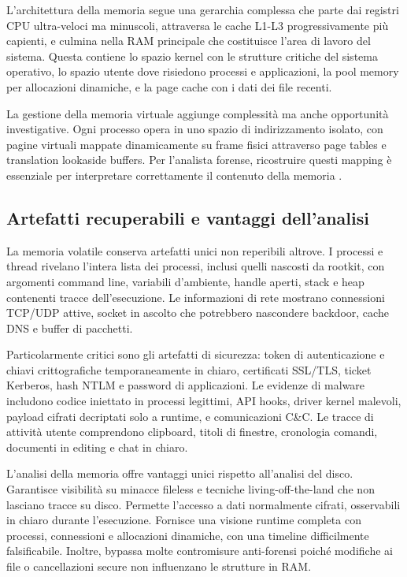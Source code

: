 L'architettura della memoria segue una gerarchia complessa che parte dai registri CPU ultra-veloci ma minuscoli, attraversa le cache L1-L3 progressivamente più capienti, e culmina nella RAM principale che costituisce l'area di lavoro del sistema. Questa contiene lo spazio kernel con le strutture critiche del sistema operativo, lo spazio utente dove risiedono processi e applicazioni, la pool memory per allocazioni dinamiche, e la page cache con i dati dei file recenti.

La gestione della memoria virtuale aggiunge complessità ma anche opportunità investigative. Ogni processo opera in uno spazio di indirizzamento isolato, con pagine virtuali mappate dinamicamente su frame fisici attraverso page tables e translation lookaside buffers. Per l'analista forense, ricostruire questi mapping è essenziale per interpretare correttamente il contenuto della memoria \cite{case2017}.

\subsection{Artefatti recuperabili e vantaggi dell'analisi}

La memoria volatile conserva artefatti unici non reperibili altrove. I processi e thread rivelano l'intera lista dei processi, inclusi quelli nascosti da rootkit, con argomenti command line, variabili d'ambiente, handle aperti, stack e heap contenenti tracce dell'esecuzione. Le informazioni di rete mostrano connessioni TCP/UDP attive, socket in ascolto che potrebbero nascondere backdoor, cache DNS e buffer di pacchetti.

Particolarmente critici sono gli artefatti di sicurezza: token di autenticazione e chiavi crittografiche temporaneamente in chiaro, certificati SSL/TLS, ticket Kerberos, hash NTLM e password di applicazioni. Le evidenze di malware includono codice iniettato in processi legittimi, API hooks, driver kernel malevoli, payload cifrati decriptati solo a runtime, e comunicazioni C\&C. Le tracce di attività utente comprendono clipboard, titoli di finestre, cronologia comandi, documenti in editing e chat in chiaro.

L'analisi della memoria offre vantaggi unici rispetto all'analisi del disco. Garantisce visibilità su minacce fileless e tecniche living-off-the-land che non lasciano tracce su disco. Permette l'accesso a dati normalmente cifrati, osservabili in chiaro durante l'esecuzione. Fornisce una visione runtime completa con processi, connessioni e allocazioni dinamiche, con una timeline difficilmente falsificabile. Inoltre, bypassa molte contromisure anti-forensi poiché modifiche ai file o cancellazioni secure non influenzano le strutture in RAM.

